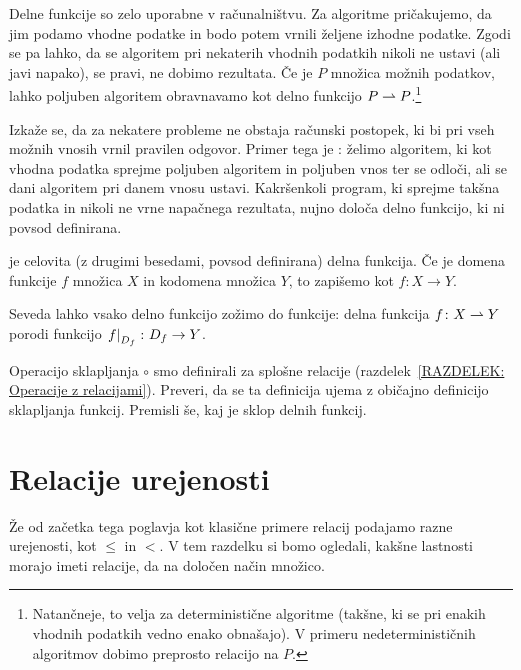 		\begin{zgled}
			Delne funkcije so zelo uporabne v računalništvu. Za algoritme pričakujemo, da jim podamo vhodne podatke in bodo potem vrnili željene izhodne podatke. Zgodi se pa lahko, da se algoritem pri nekaterih vhodnih podatkih nikoli ne ustavi (ali javi napako), se pravi, ne dobimo rezultata. Če je $P$ množica možnih podatkov, lahko poljuben algoritem obravnavamo kot delno funkcijo $P \mathrel{\rightharpoonup} P$.\footnote{Natančneje, to velja za deterministične algoritme (takšne, ki se pri enakih vhodnih podatkih vedno enako obnašajo). V primeru nedeterminističnih algoritmov dobimo preprosto relacijo na $P$.}
			
			Izkaže se, da za nekatere probleme ne obstaja računski postopek, ki bi pri vseh možnih vnosih vrnil pravilen odgovor. Primer tega je : želimo algoritem, ki kot vhodna podatka sprejme poljuben algoritem in poljuben vnos ter se odloči, ali se dani algoritem pri danem vnosu ustavi. Kakršenkoli program, ki sprejme takšna podatka in nikoli ne vrne napačnega rezultata, nujno določa delno funkcijo, ki ni povsod definirana. 
		\end{zgled}
		
		\begin{definicija}
			 je celovita (z drugimi besedami, povsod definirana) delna funkcija. Če je domena funkcije $f$ množica $X$ in kodomena množica $Y$, to zapišemo kot $f\colon X \to Y$.
		\end{definicija}
		
		Seveda lahko vsako delno funkcijo zožimo do funkcije: delna funkcija $f\colon X \mathrel{\rightharpoonup} Y$ porodi funkcijo $\left.{f}\right|_{D_{f}}\colon D_{f} \to Y$.
		
		\begin{vaja}
			Operacijo sklapljanja $\circ$ smo definirali za splošne relacije (razdelek~\ref{RAZDELEK: Operacije z relacijami}). Preveri, da se ta definicija ujema z običajno definicijo sklapljanja funkcij. Premisli še, kaj je sklop delnih funkcij.
		\end{vaja}
	
	
	\section{Relacije urejenosti}\label{RAZDELEK: Relacije urejenosti}
	
		Že od začetka tega poglavja kot klasične primere relacij podajamo razne urejenosti, kot $\leq$ in $<$. V tem razdelku si bomo ogledali, kakšne lastnosti morajo imeti relacije, da na določen način  množico.
		
